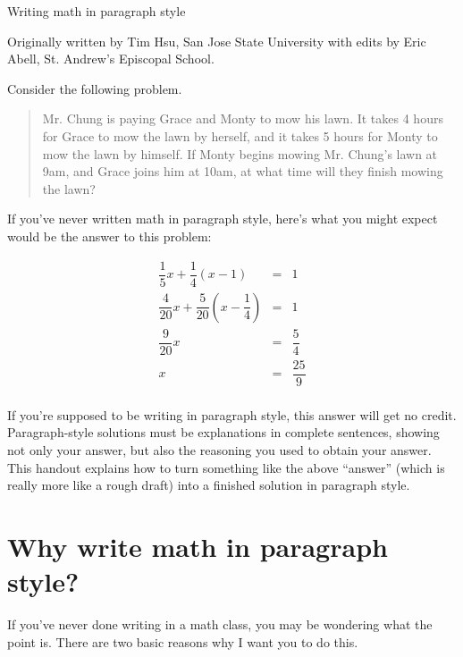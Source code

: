 \documentclass{article}
\begin{document}
\begin{center}
\Huge{Writing math in paragraph style}
\end{center}

Originally written by Tim Hsu, San Jose State University with edits by Eric Abell, St. Andrew's Episcopal School.

Consider the following problem.

\begin{quote}
Mr. Chung is paying Grace and Monty to mow his lawn. It takes 4 hours for Grace to mow the lawn by herself, and it takes 5 hours for Monty to mow the lawn by himself. If Monty begins mowing Mr. Chung's lawn at 9am, and Grace joins him at 10am, at what time will they finish mowing the lawn?
\end{quote}

If you've never written math in paragraph style, here's what you might expect would be the answer to this problem:

\begin{eqnarray*}
	\dfrac{1}{5}x + \dfrac{1}{4}(x - 1) &=& 1 \\
	\dfrac{4}{20}x + \dfrac{5}{20}\left(x - \dfrac{1}{4}\right) &=& 1 \\
	\dfrac{9}{20}x &=& \dfrac{5}{4} \\
	x &=& \dfrac{25}{9} \\
\end{eqnarray*}

If you're supposed to be writing in paragraph style, this answer will get no credit. Paragraph-style solutions must be explanations in complete sentences, showing not only your answer, but also the reasoning you used to obtain your answer. This handout explains how to turn something like the above ``answer'' (which is really more like a rough draft) into a finished solution in paragraph style.

\section*{Why write math in paragraph style?}
If you've never done writing in a math class, you may be wondering what the point is. There are two basic reasons why I want you to do this.
\end{document}
